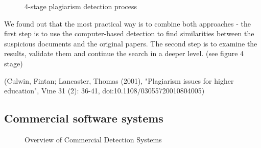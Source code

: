  \begin{figure}[!h]
  \centering
  \caption{4-stage plagiarism detection process}
  \label{fig:4-stage plagiarism detection process}
\end{figure}

We found out that the most practical way is to combine both approaches - the first step is to use the computer-based detection to find similarities between the suspicious documents and the original papers. The second step is to examine the results, validate them and continue the search in a deeper level. (see figure 4 stage)



(Culwin, Fintan; Lancaster, Thomas (2001), "Plagiarism issues for higher education", Vine 31 (2): 36-41, doi:10.1108/03055720010804005)

\newpage
\subsection{Commercial software systems} 

 
 \begin{figure}[!h]
  \centering
  \caption{Overview of Commercial Detection Systems}
  \label{fig:overview_systems}
\end{figure}



